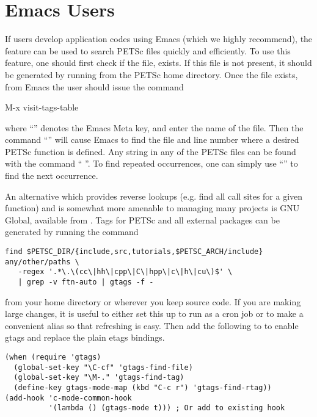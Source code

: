 {{\section{Emacs Users}  \label{sec_emacs}

 
If users develop application codes  using Emacs (which we
highly recommend), the  feature can be used to search PETSc
files quickly and efficiently.  To use this feature, one should
first check if the file,
 exists.  If this file is
not present, it should be generated by
running   from the PETSc home directory.
Once the file exists, from
Emacs the user should issue
the command
\begin{tabbing}
 M-x visit-tags-table
\end{tabbing}
 where ``''
denotes the Emacs Meta key, and enter the
name of the  file. Then the command ``'' will cause Emacs
to find the file and line number where a desired PETSc function
is defined.  Any string in any of the PETSc files can be found with the
command `` ''. To find repeated occurrences,
one can simply use ``'' to find the next occurrence.

An alternative which provides reverse lookups (e.g. find all call sites for a given function) and is somewhat more amenable to managing many projects is GNU Global, available from .
Tags for PETSc and all external packages can be generated by running the command
\begin{verbatim}
find $PETSC_DIR/{include,src,tutorials,$PETSC_ARCH/include} any/other/paths \
   -regex '.*\.\(cc\|hh\|cpp\|C\|hpp\|c\|h\|cu\)$' \
   | grep -v ftn-auto | gtags -f -
\end{verbatim}
from your home directory or wherever you keep source code.
If you are making large changes, it is useful to either set this up to run as a cron job or to make a convenient alias so that refreshing is easy.
Then add the following to \trl{~/.emacs} to enable gtags and replace the plain etags bindings.
\begin{verbatim}
(when (require 'gtags)
  (global-set-key "\C-cf" 'gtags-find-file)
  (global-set-key "\M-." 'gtags-find-tag)
  (define-key gtags-mode-map (kbd "C-c r") 'gtags-find-rtag))
(add-hook 'c-mode-common-hook
          '(lambda () (gtags-mode t))) ; Or add to existing hook
\end{verbatim}

}}
